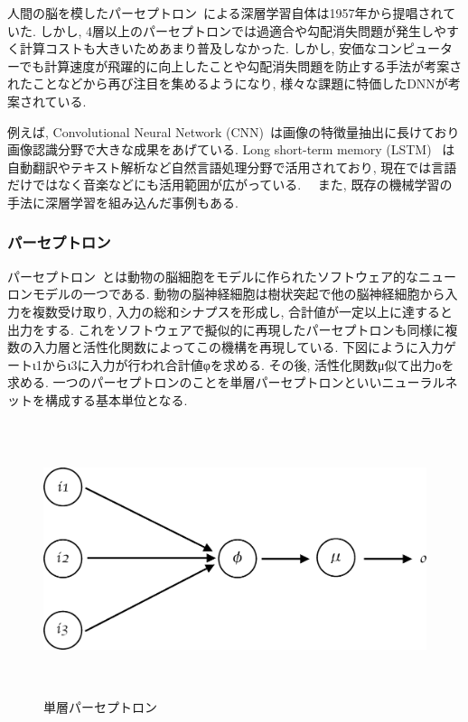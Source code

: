 人間の脳を模したパーセプトロン~\cite{Perceptron}による深層学習自体は1957年から提唱されていた. しかし, 4層以上のパーセプトロンでは過適合や勾配消失問題が発生しやすく計算コストも大きいためあまり普及しなかった.
しかし, 安価なコンピューターでも計算速度が飛躍的に向上したことや勾配消失問題を防止する手法が考案されたことなどから再び注目を集めるようになり, 様々な課題に特価したDNNが考案されている.

例えば, Convolutional Neural Network (CNN)~\cite{CNN}は画像の特徴量抽出に長けており画像認識分野で大きな成果をあげている.
Long short-term memory (LSTM) ~\cite{LSTM}は自動翻訳やテキスト解析など自然言語処理分野で活用されており, 現在では言語だけではなく音楽などにも活用範囲が広がっている.~\cite{LSTMMusic}~\cite{MusicGenerate}
また, 既存の機械学習の手法に深層学習を組み込んだ事例もある.~\cite{DQN}

\subsubsection{パーセプトロン}

パーセプトロン~\cite{Perceptron}とは動物の脳細胞をモデルに作られたソフトウェア的なニューロンモデルの一つである.
動物の脳神経細胞は樹状突起で他の脳神経細胞から入力を複数受け取り, 入力の総和シナプスを形成し, 合計値が一定以上に達すると出力をする. 
これをソフトウェアで擬似的に再現したパーセプトロンも同様に複数の入力層と活性化関数によってこの機構を再現している.
下図にように入力ゲートι1からι3に入力が行われ合計値φを求める. その後, 活性化関数μ似て出力οを求める.
一つのパーセプトロンのことを単層パーセプトロンといいニューラルネットを構成する基本単位となる. 

\begin{figure}[H]
    \centering
    \includegraphics[clip,height = 8.0cm]{assets/Single_Perceptron.eps}
    \caption{単層パーセプトロン}  \label{sample}
\end{figure}


